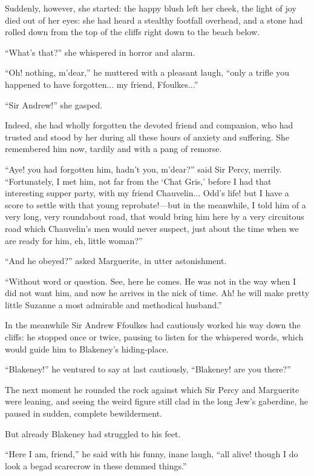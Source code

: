 \documentclass[paper=a5,BCOR=7mm,twoside,DIV=calc,12pt,usegeometry,chapterprefix,endperiod,headings=big]{scrbook}
\begin{document}
Suddenly, however, she started: the happy blush left her cheek, the light of joy died out of her eyes: she had heard a stealthy footfall overhead, and a stone had rolled down from the top of the cliffs right down to the beach below.

\enquote{What's that?} she whispered in horror and alarm.

\enquote{Oh! nothing, m'dear,} he muttered with a pleasant laugh, \enquote{only a trifle you happened to have forgotten... my friend, Ffoulkes...}

\enquote{Sir Andrew!} she gasped.

Indeed, she had wholly forgotten the devoted friend and companion, who had trusted and stood by her during all these hours of anxiety and suffering. She remembered him now, tardily and with a pang of remorse.

\enquote{Aye! you had forgotten him, hadn't you, m'dear?} said Sir Percy, merrily. \enquote{Fortunately, I met him, not far from the \enquote{Chat Gris,} before I had that interesting supper party, with my friend Chauvelin... Odd's life! but I have a score to settle with that young reprobate!---but in the meanwhile, I told him of a very long, very roundabout road, that would bring him here by a very circuitous road which Chauvelin's men would never suspect, just about the time when we are ready for him, eh, little woman?}

\enquote{And he obeyed?} asked Marguerite, in utter astonishment.

\enquote{Without word or question. See, here he comes. He was not in the way when I did not want him, and now he arrives in the nick of time. Ah! he will make pretty little Suzanne a most admirable and methodical husband.}

In the meanwhile Sir Andrew Ffoulkes had cautiously worked his way down the cliffs: he stopped once or twice, pausing to listen for the whispered words, which would guide him to Blakeney's hiding-place.

\enquote{Blakeney!} he ventured to say at last cautiously, \enquote{Blakeney! are you there?}

The next moment he rounded the rock against which Sir Percy and Marguerite were leaning, and seeing the weird figure still clad in the long Jew's gaberdine, he paused in sudden, complete bewilderment.

But already Blakeney had struggled to his feet.

\enquote{Here I am, friend,} he said with his funny, inane laugh, \enquote{all alive! though I do look a begad scarecrow in these demmed things.}
\end{document}
